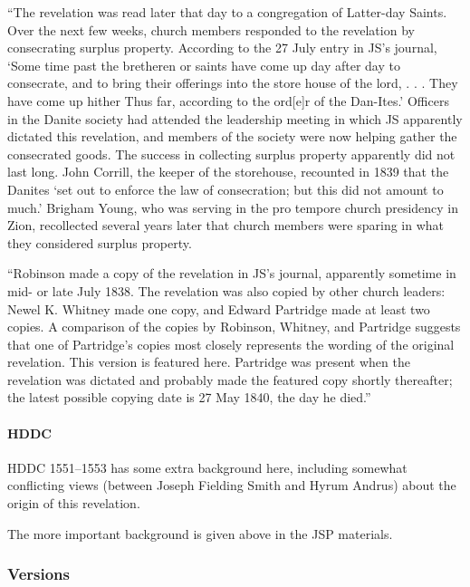 			``The revelation was read later that day to a congregation of Latter-day Saints. Over the next few weeks, church members responded to the revelation by consecrating surplus property. According to the 27 July entry in JS's journal, `Some time past the bretheren or saints have come up day after day to consecrate, and to bring their offerings into the store house of the lord, . . . They have come up hither Thus far, according to the ord[e]r of the Dan-Ites.' Officers in the Danite society had attended the leadership meeting in which JS apparently dictated this revelation, and members of the society were now helping gather the consecrated goods. The success in collecting surplus property apparently did not last long. John Corrill, the keeper of the storehouse, recounted in 1839 that the Danites `set out to enforce the law of consecration; but this did not amount to much.' Brigham Young, who was serving in the pro tempore church presidency in Zion, recollected several years later that church members were sparing in what they considered surplus property.
			
			``Robinson made a copy of the revelation in JS's journal, apparently sometime in mid- or late July 1838. The revelation was also copied by other church leaders: Newel K. Whitney made one copy, and Edward Partridge made at least two copies. A comparison of the copies by Robinson, Whitney, and Partridge suggests that one of Partridge's copies most closely represents the wording of the original revelation. This version is featured here. Partridge was present when the revelation was dictated and probably made the featured copy shortly thereafter; the latest possible copying date is 27 May 1840, the day he died.''
			
		\paragraph{HDDC}
		
			HDDC 1551--1553 has some extra background here, including somewhat conflicting views (between Joseph Fielding Smith and Hyrum Andrus) about the origin of this revelation.
			
			The more important background is given above in the JSP materials.
					
	\subsubsection{Versions}
		\label{DC119-V}
		
